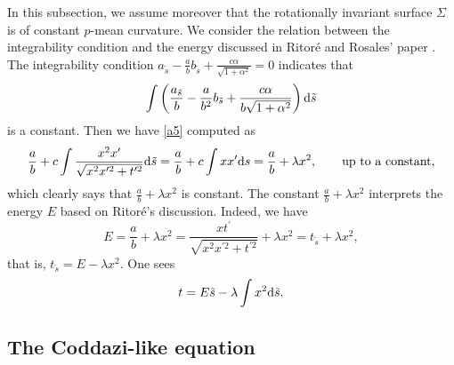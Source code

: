 \documentclass[10pt,a4paper]{amsart}
\numberwithin{equation}{section}
\begin{document}
In this subsection, we assume moreover that the rotationally invariant surface $\Sigma$ is of constant $p$-mean curvature. We consider the relation between the integrability condition and the
energy discussed in Ritor\'e and Rosales' paper \cite{Ritore/Rosales:2006}. The integrability condition
$
a_{\tilde s}-\frac{a}{b}b_{\tilde s}+\frac{c\alpha}{\sqrt{1+\alpha^2}}=0
$
indicates that
\begin{equation} \label{a5}
\int \left(\frac{a_{\tilde s}}{b}-\frac{a}{b^2}b_{\tilde s}+\frac{c\alpha}{b\sqrt{
1+\alpha^2}}\right){\rm d}\tilde s
\end{equation}
is a constant. Then we have \eqref{a5} computed as
\begin{equation*}
\frac{a}{b}+c\int \frac{x^2x^{\prime }}{\sqrt{x^2x^{\prime 2}+t^{\prime 2}}}
{\rm d}\tilde s
=\frac{a}{b}+c\int xx^{\prime }{\rm d}s
=\frac{a}{b}+\lambda x^2, \qquad\textrm{up to a constant},
\end{equation*}
which clearly says that $\frac{a}{b}+\lambda x^2$ is constant.
The constant $\frac{a}{b}+\lambda x^2$ interprets the energy $E$ based on
Ritor\'e's discussion. Indeed, we have
\begin{equation} \label{ffe}
E=\frac{a}{b}+\lambda x^2 =\frac{xt^{\prime }}{\sqrt{x^2x^{\prime 2}+t^{\prime 2}}}+\lambda x^2 =t_{\tilde s}+\lambda x^2,
\end{equation}
that is, $t_{\tilde s}=E-\lambda x^2$. One sees
\begin{equation} \label{function_t}
t=E\tilde s-\lambda \int x^2{\rm d}\tilde s.
\end{equation}

\subsection{The Coddazi-like equation}
\end{document}
